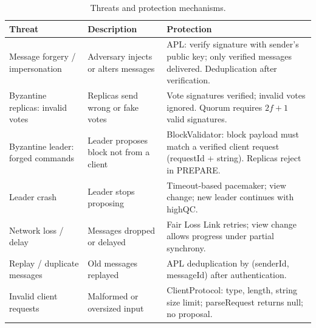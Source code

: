 \documentclass{llncs}
\begin{document}
\begin{table}[H]
  \caption{Threats and protection mechanisms.}
  \label{tab:threats}
  \centering
  \small
  \renewcommand{\arraystretch}{0.85}
  \begin{tabularx}{\linewidth}{@{}lXX@{}}
    \toprule
    \textbf{Threat} & \textbf{Description} & \textbf{Protection} \\
    \midrule
    Message forgery / impersonation & Adversary injects or alters messages & APL: verify signature with sender's public key; only verified messages delivered. Deduplication after verification. \\
    Byzantine replicas: invalid votes & Replicas send wrong or fake votes & Vote signatures verified; invalid votes ignored. Quorum requires $2f+1$ valid signatures. \\
    Byzantine leader: forged commands & Leader proposes block not from a client & BlockValidator: block payload must match a verified client request (requestId + string). Replicas reject in PREPARE. \\
    Leader crash & Leader stops proposing & Timeout-based pacemaker; view change; new leader continues with highQC. \\
    Network loss / delay & Messages dropped or delayed & Fair Loss Link retries; view change allows progress under partial synchrony. \\
    Replay / duplicate messages & Old messages replayed & APL deduplication by (senderId, messageId) after authentication. \\
    Invalid client requests & Malformed or oversized input & ClientProtocol: type, length, string size limit; parseRequest returns null; no proposal. \\
    \bottomrule
  \end{tabularx}
\end{table}
\end{document}
